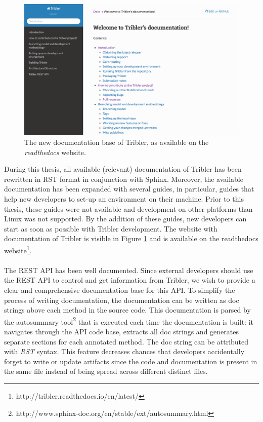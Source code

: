 \begin{figure}[h!]
	\centering
	\includegraphics[width=1.0\columnwidth]{images/improving_qa/readthedocs}
	\caption{The new documentation base of Tribler, as available on the \emph{readthedocs} website.}
	\label{fig:documentation-tribler}
\end{figure}

\noindent During this thesis, all available (relevant) documentation of Tribler has been rewritten in RST format in conjunction with Sphinx. Moreover, the available documentation has been expanded with several guides, in particular, guides that help new developers to set-up an environment on their machine. Prior to this thesis, these guides were not available and development on other platforms than Linux was not supported. By the addition of these guides, new developers can start as soon as possible with Tribler development. The website with documentation of Tribler is visible in Figure \ref{fig:documentation-tribler} and is available on the readthedocs website\footnote{http://tribler.readthedocs.io/en/latest/}.\\\\
The REST API has been well documented. Since external developers should use the REST API to control and get information from Tribler, we wish to provide a clear and comprehensive documentation base for this API. To simplify the process of writing documentation, the documentation can be written as doc strings above each method in the source code. This documentation is parsed by the autosummary tool\footnote{http://www.sphinx-doc.org/en/stable/ext/autosummary.html} that is executed each time the documentation is built: it navigates through the API code base, extracts all doc strings and generates separate sections for each annotated method. The doc string can be attributed with \emph{RST} syntax. This feature decreases chances that developers accidentally forget to write or update artifacts since the code and documentation is present in the same file instead of being spread across different distinct files.

